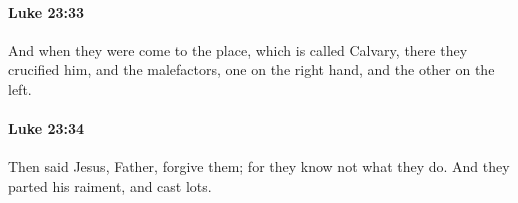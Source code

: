 		\paragraph{Luke 23:33} %
			\label{LUKE-23-33}

			And when they were come to the place, which is called Calvary, there they crucified him, and the malefactors, one on the right hand, and the other on the left.

			\begin{framed}
			\scriptsize
				\begin{compactdesc}
					\item[SBLG] 
				\end{compactdesc}
			\end{framed}

		\paragraph{Luke 23:34} %
			\label{LUKE-23-34}

			Then said Jesus, Father, forgive them; for they know not what they do. And they parted his raiment, and cast lots.

